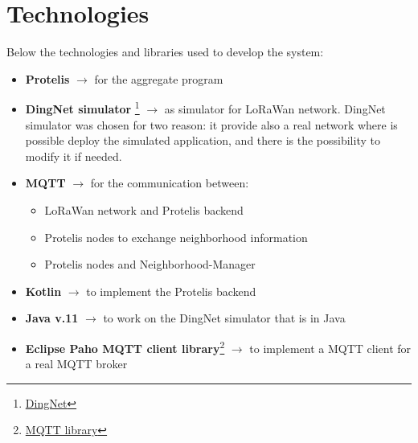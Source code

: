 \chapter{Technologies}

Below the technologies and libraries used to develop the system:

\begin{itemize}
    \item \textbf{Protelis} $\rightarrow$ for the aggregate program
    \item \textbf{DingNet simulator} \footnote{\href{https://github.com/dimoibiehg/DingNet}{DingNet}} $\rightarrow$ as simulator for LoRaWan network. DingNet simulator was chosen for two reason: it provide also a real network where is possible deploy the simulated application, and there is the possibility to modify it if needed.  
    \item \textbf{MQTT} $\rightarrow$ for the communication between:
    \begin{itemize}
        \item LoRaWan network and Protelis backend
        \item Protelis nodes to exchange neighborhood information
        \item Protelis nodes and Neighborhood-Manager
    \end{itemize}
    \item \textbf{Kotlin} $\rightarrow$ to implement the Protelis backend
    \item \textbf{Java v.11} $\rightarrow$ to work on the DingNet simulator that is in Java
    \item \textbf{Eclipse Paho MQTT client library}\footnote{\href{https://github.com/eclipse/paho.mqtt.java}{MQTT library}} $\rightarrow$ to implement a MQTT client for a real MQTT broker
\end{itemize}

